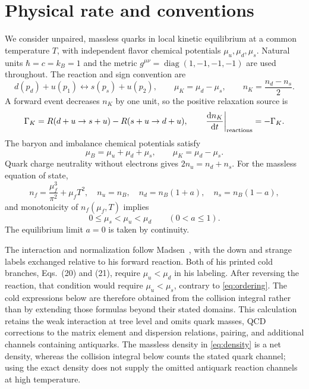 \documentclass[11pt,letterpaper]{article}
\numberwithin{equation}{section}
\newcommand{\dd}{\mathrm d}
\begin{document}
\section{Physical rate and conventions}
\label{sec:conventions}
We consider unpaired, massless quarks in local kinetic equilibrium at a common temperature \(T\), with independent flavor chemical potentials \(\mu_u,\mu_d,\mu_s\).
Natural units \(\hbar=c=k_B=1\) and the metric \(g^{\mu\nu}=\operatorname{diag}(1,-1,-1,-1)\) are used throughout.
The reaction and sign convention are
\begin{equation}
 d(p_d)+u(p_1)\longleftrightarrow s(p_s)+u(p_2),
 \qquad \mu_K=\mu_d-\mu_s,
 \qquad n_K=\frac{n_d-n_s}{2}.
 \label{eq:reaction}
\end{equation}
A forward event decreases \(n_K\) by one unit, so the positive relaxation source is
\begin{equation}
 \Gamma_K=R(d+u\to s+u)-R(s+u\to d+u),
 \qquad \left.\frac{\dd n_K}{\dd t}\right|_{\rm reactions}=-\Gamma_K.
 \label{eq:source}
\end{equation}
The baryon and imbalance chemical potentials satisfy
\begin{equation}
 \mu_B=\mu_u+\mu_d+\mu_s,
 \qquad \mu_K=\mu_d-\mu_s.
 \label{eq:chemical-basis}
\end{equation}
Quark charge neutrality without electrons gives \(2n_u=n_d+n_s\).
For the massless equation of state,
\begin{equation}
 n_f=\frac{\mu_f^3}{\pi^2}+\mu_fT^2,
 \quad n_u=n_B,\quad n_d=n_B(1+a),\quad n_s=n_B(1-a),
 \label{eq:density}
\end{equation}
and monotonicity of \(n_f(\mu_f,T)\) implies
\begin{equation}
 0\leq\mu_s<\mu_u<\mu_d\qquad (0<a\leq1).
 \label{eq:ordering}
\end{equation}
The equilibrium limit \(a=0\) is taken by continuity.

The interaction and normalization follow Madsen~\cite{Madsen:1993xx}, with the down and strange labels exchanged relative to his forward reaction.
Both of his printed cold branches, Eqs.~(20) and (21), require \(\mu_u<\mu_d\) in his labeling.
After reversing the reaction, that condition would require \(\mu_u<\mu_s\), contrary to \cref{eq:ordering}.
The cold expressions below are therefore obtained from the collision integral rather than by extending those formulas beyond their stated domains.
This calculation retains the weak interaction at tree level and omits quark masses, QCD corrections to the matrix element and dispersion relations, pairing, and additional channels containing antiquarks.
The massless density in \cref{eq:density} is a net density, whereas the collision integral below counts the stated quark channel; using the exact density does not supply the omitted antiquark reaction channels at high temperature.
\end{document}
